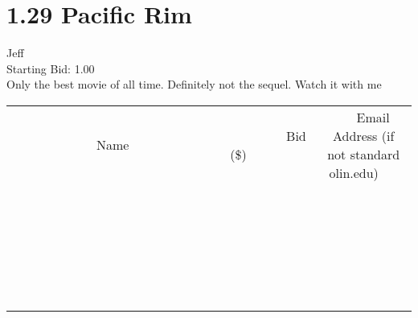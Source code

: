 \documentclass[11pt]{article}
\begin{document}
					\section*{1.29 Pacific Rim}
					Jeff \\
					Starting Bid: 1.00 \\
					Only the best movie of all time. Definitely not the sequel. Watch it with me \\
					[6ex]
					\begin{tabular}{c c c}
						~~~~~~~~~~~~~Name~~~~~~~~~~~~~ & ~~~~~~~~~Bid (\$)~~~~~~~~~ & ~~~Email Address (if not standard olin.edu)~~~ \\
				
 & & \\
\hline
 & & \\
\hline
 & & \\
\hline
 & & \\
\hline
 & & \\
\hline
 & & \\
\hline
 & & \\
\hline
 & & \\
\hline
 & & \\
\hline
 & & \\
\hline
 & & \\
\hline
 & & \\
\hline
 & & \\
\hline
 & & \\
\hline
 & & \\
\hline
 & & \\
\hline
 & & \\
\hline
 & & \\
\hline
 & & \\
\hline
 & & \\
\hline
 & & \\
\hline
 & & \\
\hline
 & & \\
\hline
 & & \\
\hline
 & & \\
\hline
 & & \\
\hline
					\end{tabular}
					\clearpage
				
\end{document}
